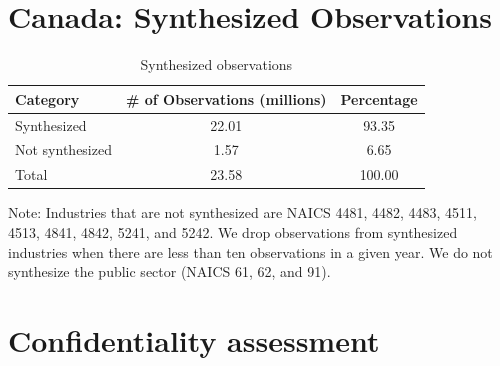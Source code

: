 \section{Canada: Synthesized Observations}
\label{sec:synth_obs}


\begin{table}[H]
  \centering
\begin{threeparttable}
  \caption{Synthesized observations}  \label{tab:Synthesized_observations} \medskip
  \renewcommand{\arraystretch}{1}
  \begin{tabular}{l  c c }
    \toprule
    \textbf{Category}&\textbf{\# of Observations (millions)}&\textbf{Percentage}\\
    \midrule
Synthesized&22.01&93.35\\
Not synthesized&1.57&6.65\\
Total&23.58&100.00\\
    \bottomrule
  \end{tabular} 
\begin{tablenotes}
\small
\item Note: Industries that are not synthesized are NAICS 4481,    4482,     4483,     4511,     4513,     4841,     4842, 5241, and 5242. We drop observations from  synthesized industries when there are  less than ten observations in a given year. We do not synthesize the public sector (NAICS 61, 62, and 91).
 \end{tablenotes}
 \end{threeparttable}
\end{table}
 
\section{Confidentiality assessment}
\label{sec:conf:appendix}


